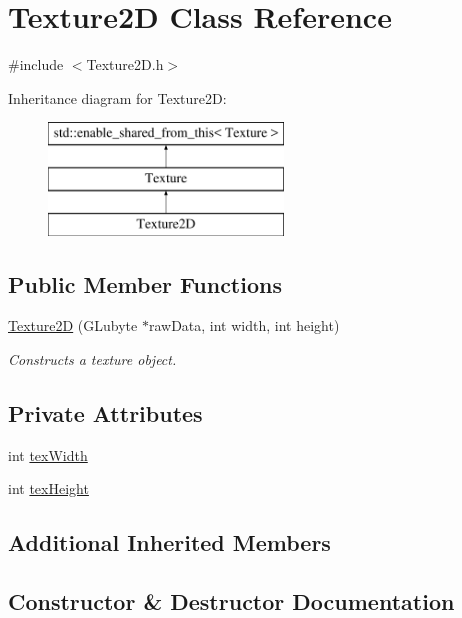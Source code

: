 \hypertarget{class_texture2_d}{}\section{Texture2D Class Reference}
\label{class_texture2_d}


{\ttfamily \#include $<$Texture2\+D.\+h$>$}

Inheritance diagram for Texture2D\+:\begin{figure}[H]
\begin{center}
\leavevmode
\includegraphics[height=3.000000cm]{class_texture2_d}
\end{center}
\end{figure}
\subsection*{Public Member Functions}
\begin{DoxyCompactItemize}
\item
\hyperlink{class_texture2_d_ad033510acef475ce46df4eda3d388546}{Texture2D} (G\+Lubyte $\ast$raw\+Data, int width, int height)
\begin{DoxyCompactList}\small\item\em Constructs a texture object. \end{DoxyCompactList}\end{DoxyCompactItemize}
\subsection*{Private Attributes}
\begin{DoxyCompactItemize}
\item
int \hyperlink{class_texture2_d_adf75753ea19d57141c9da0ff3298a20d}{tex\+Width}
\item
int \hyperlink{class_texture2_d_ae7a111c14c36358906cebf47e94541e2}{tex\+Height}
\end{DoxyCompactItemize}
\subsection*{Additional Inherited Members}


\subsection{Constructor \& Destructor Documentation}
\hypertarget{class_texture2_d_ad033510acef475ce46df4eda3d388546}{}\label{class_texture2_d_ad033510acef475ce46df4eda3d388546}

